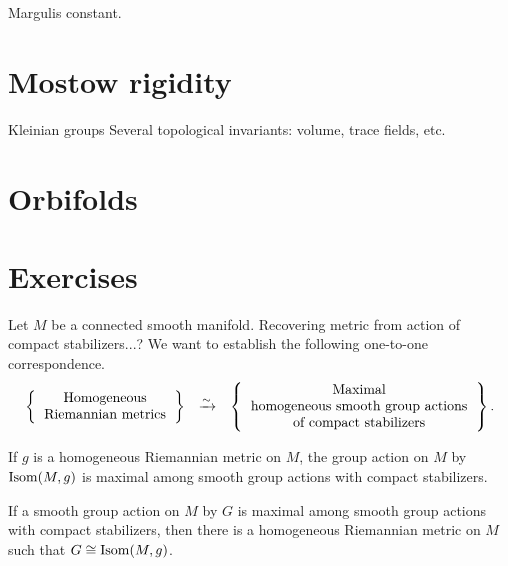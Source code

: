 \documentclass{../../large}
\begin{document}
\begin{prb}
Margulis constant.
\end{prb}

\begin{prb}
\end{prb}


\section{Mostow rigidity}
Kleinian groups
Several topological invariants: volume, trace fields, etc.


\section{Orbifolds}


\section*{Exercises}

\begin{prb}
Let $M$ be a connected smooth manifold.
Recovering metric from action of compact stabilizers...?
We want to establish the following one-to-one correspondence.
\[\begin{array}{ccc}
\left\{\begin{tabular}{c}Homogeneous\\Riemannian metrics\end{tabular}\right\}
&\xrightarrow{\sim}&
\left\{\begin{tabular}{c}Maximal\\homogeneous smooth group actions\\of compact stabilizers\end{tabular}\right\}.
\end{array}\]
\begin{parts}
\item If $g$ is a homogeneous Riemannian metric on $M$, the group action on $M$ by $\operatorname{Isom}(M,g)$ is maximal among smooth group actions with compact stabilizers.
\item If a smooth group action on $M$ by $G$ is maximal among smooth group actions with compact stabilizers, then there is a homogeneous Riemannian metric on $M$ such that $G\cong\operatorname{Isom}(M,g)$.
\end{parts}
\end{prb}
\begin{pf}
\end{pf}
\end{document}
